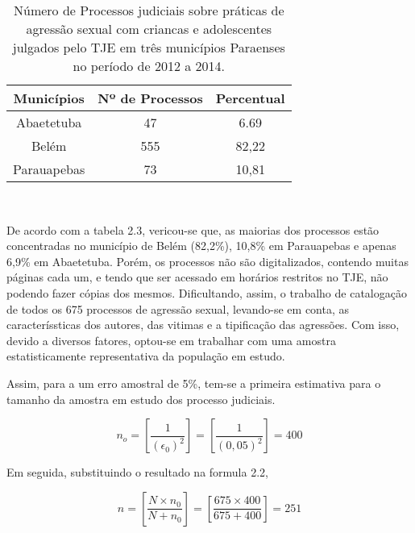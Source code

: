 \begin{table}[!htb]
    \centering
    {
    \caption{Número de Processos judiciais sobre práticas de agressão sexual com criancas e
adolescentes julgados pelo TJE em três municípios Paraenses no período de 2012 a 2014.}
    \label{amostras estratificada}
    \vspace{0.1cm}
\begin{tabular}{c|c|c}
  \hline\hline
  Municípios   & Nº de Processos &  Percentual \\
  \hline\hline
   Abaetetuba  & 47              & 6.69        \\
   Belém       & 555             & 82,22       \\
   Parauapebas & 73              & 10,81       \\
  \hline\hline
\end{tabular}}
\\
\hspace{-1.0cm}
\end{table}

De acordo com a tabela 2.3, vericou-se que, as maiorias dos processos estão
concentradas no município de Belém (82,2\%), 10,8\% em Parauapebas e apenas 6,9\%
em Abaetetuba. Porém, os processos não são digitalizados, contendo muitas páginas
cada um, e tendo que ser acessado em horários restritos no TJE, não podendo fazer
cópias dos mesmos. Dificultando, assim, o trabalho de catalogação de todos os 675
processos de agressão sexual, levando-se em conta, as caracteríssticas dos autores, das
vitimas e a tipificação das agressões. Com isso, devido a diversos fatores, optou-se
em trabalhar com uma amostra estatisticamente representativa da população em estudo.
\vskip0.3cm

Assim, para a um erro amostral de 5\%, tem-se a primeira estimativa para o tamanho da amostra em estudo dos processo judiciais.

\begin{equation}\label{nzero}
    n_{o}= \left[\frac{1}{\left(\epsilon_{0}\right)^2}\right] = \left[\frac{1}{\left(0,05
    \right)^2}\right]=400
\end{equation}

Em seguida, substituindo o resultado na formula 2.2,

\begin{equation}\label{nzero2}
    n=\left[\frac{N \times n_{0}}{N + n_{0}}\right]=
    \left[\frac{675 \times 400}{675 + 400}\right]=251
\end{equation}

